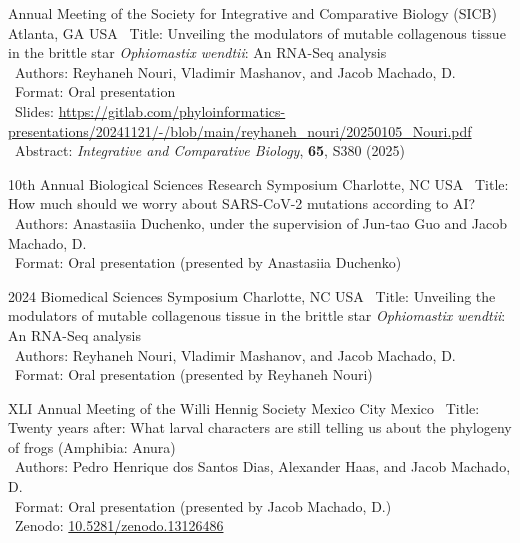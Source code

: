 \documentclass[11pt, letterpaper, sans]{moderncv}
\begin{document}
    {Annual Meeting of the Society for Integrative and Comparative Biology (SICB)}
    {Atlanta, GA}
    {USA}
    {}
    {
        \textbullet~Title: Unveiling the modulators of mutable collagenous tissue in the brittle star \textit{Ophiomastix wendtii}: An RNA-Seq analysis\\
        \textbullet~Authors: Reyhaneh Nouri, Vladimir Mashanov, and Jacob Machado, D.\\
        \textbullet~Format: Oral presentation\\
        \textbullet~Slides: \url{https://gitlab.com/phyloinformatics-presentations/20241121/-/blob/main/reyhaneh_nouri/20250105_Nouri.pdf}\\
        \textbullet~Abstract: \textit{Integrative and Comparative Biology}, \textbf{65}, S380 (2025)
    }

    {10th Annual Biological Sciences Research Symposium}
    {Charlotte, NC}
    {USA}
    {}
    {
        \textbullet~Title: How much should we worry about SARS-CoV-2 mutations according to AI?\\
        \textbullet~Authors: Anastasiia Duchenko, under the supervision of Jun-tao Guo and Jacob Machado, D.\\
        \textbullet~Format: Oral presentation (presented by Anastasiia Duchenko)
    }

    {2024 Biomedical Sciences Symposium}
    {Charlotte, NC}
    {USA}
    {}
    {
        \textbullet~Title: Unveiling the modulators of mutable collagenous tissue in the brittle star \textit{Ophiomastix wendtii}: An RNA-Seq analysis\\
        \textbullet~Authors: Reyhaneh Nouri, Vladimir Mashanov, and Jacob Machado, D.\\
        \textbullet~Format: Oral presentation (presented by Reyhaneh Nouri)
    }

    {XLI Annual Meeting of the Willi Hennig Society}
    {Mexico City}
    {Mexico}
    {}
    {
        \textbullet~Title: Twenty years after: What larval characters are still telling us about the phylogeny of frogs (Amphibia: Anura)\\
        \textbullet~Authors: Pedro Henrique dos Santos Dias, Alexander Haas, and Jacob Machado, D.\\
        \textbullet~Format: Oral presentation (presented by Jacob Machado, D.)\\
        \textbullet~Zenodo: \href{https://doi.org/10.5281/zenodo.13126486}{10.5281/zenodo.13126486}
    }
\end{document}

